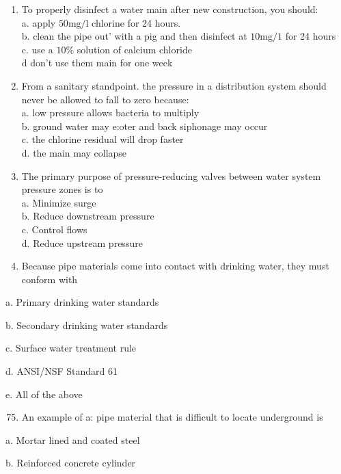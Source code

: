 \documentclass[10pt]{article}
\begin{document}
\begin{enumerate}
\begin{enumerate}
\begin{enumerate}
  \item To properly disinfect a water main after new construction, you should:\\
a. apply $50 \mathrm{mg} / \mathrm{l}$ chlorine for 24 hours.\\
b. clean the pipe out' with a pig and then disinfect at $10 \mathrm{mg} / 1$ for 24 hours\\
c. use a $10 \%$ solution of calcium chloride\\
d don't use them main for one week

  \item From a sanitary standpoint. the pressure in a distribution system should never be allowed to fall to zero because:\\
a. low pressure allows bacteria to multiply\\
b. ground water may e:oter and back siphonage may occur\\
c. the chlorine residual will drop faster\\
d. the main may collapse

  \item The primary purpose of pressure-reducing valves between water system pressure zones is to\\
a. Minimize surge\\
b. Reduce downstream pressure\\
c. Control flows\\
d. Reduce upstream pressure\\

  \item Because pipe materials come into contact with drinking water, they must conform with

\end{enumerate}

a. Primary drinking water standards

b. Secondary drinking water standards

c. Surface water treatment rule

d. ANSI/NSF Standard 61

e. All of the above

\begin{enumerate}
  \setcounter{enumi}{74}
  \item An example of a: pipe material that is difficult to locate underground is
\end{enumerate}

a. Mortar lined and coated steel

b. Reinforced concrete cylinder


\end{enumerate}
\end{enumerate}
\end{document}
